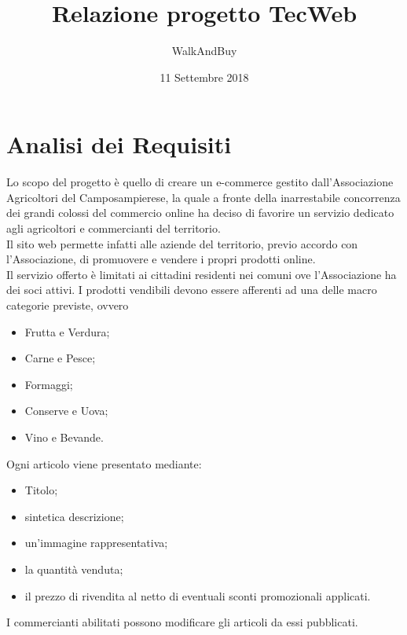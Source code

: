 



\title{\textbf{Relazione progetto TecWeb}}
\author{WalkAndBuy}

\date{11 Settembre 2018}




\makeFrontPage

\tableofcontents

\newpage

\section{Analisi dei Requisiti}

Lo scopo del progetto è quello di creare un e-commerce gestito dall’Associazione Agricoltori del Camposampierese, la quale a fronte della inarrestabile concorrenza dei grandi colossi del commercio online ha deciso di favorire un servizio dedicato agli agricoltori e commercianti del territorio.\\
Il sito web permette infatti alle aziende del territorio, previo accordo con l’Associazione, di promuovere e vendere i propri prodotti online. \\
Il servizio offerto è limitati ai cittadini residenti nei comuni ove l’Associazione ha dei soci attivi. 
I prodotti vendibili devono essere afferenti ad una delle macro categorie previste, ovvero 
\begin{itemize}
	\item Frutta e Verdura;
	\item Carne e Pesce;
	\item Formaggi;
	\item Conserve e Uova;
	\item Vino e Bevande.
\end{itemize}
Ogni articolo viene presentato mediante:
\begin{itemize}
	\item Titolo;
	\item sintetica descrizione;
	\item un’immagine rappresentativa;
	\item la quantità venduta;
	\item il prezzo di rivendita al netto di eventuali sconti promozionali applicati.
\end{itemize}
I commercianti abilitati possono modificare gli articoli da essi pubblicati.\\

